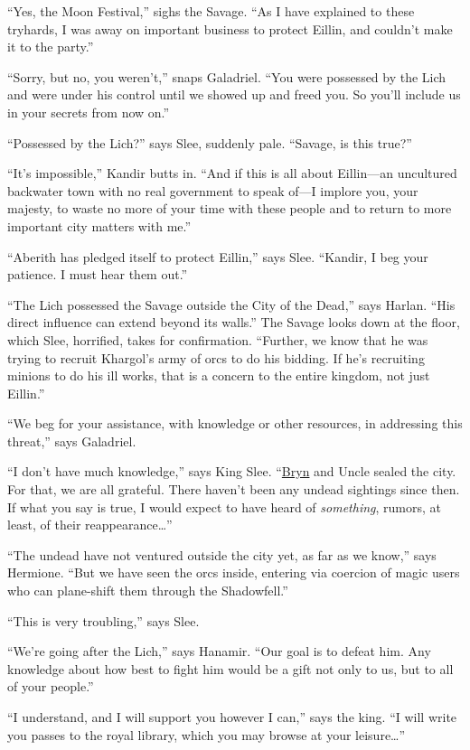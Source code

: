 \documentclass[smalldemyvopaper,11pt,twoside,onecolumn,openright,extrafontsizes]{memoir}
\begin{document}
``Yes, the Moon Festival,'' sighs the Savage. ``As I have explained to
these tryhards, I was away on important business to protect Eillin, and
couldn't make it to the party.''

``Sorry, but no, you weren't,'' snaps Galadriel. ``You were possessed by
the Lich and were under his control until we showed up and freed you. So
you'll include us in your secrets from now on.''

``Possessed by the Lich?'' says Slee, suddenly pale. ``Savage, is this
true?''

``It's impossible,'' Kandir butts in. ``And if this is all about
Eillin---an uncultured backwater town with no real government to speak
of---I implore you, your majesty, to waste no more of your time with
these people and to return to more important city matters with me.''

``Aberith has pledged itself to protect Eillin,'' says Slee. ``Kandir, I
beg your patience. I must hear them out.''

``The Lich possessed the Savage outside the City of the Dead,'' says
Harlan. ``His direct influence can extend beyond its walls.'' The Savage
looks down at the floor, which Slee, horrified, takes for confirmation.
``Further, we know that he was trying to recruit Khargol's army of orcs
to do his bidding. If he's recruiting minions to do his ill works, that
is a concern to the entire kingdom, not just Eillin.''

``We beg for your assistance, with knowledge or other resources, in
addressing this threat,'' says Galadriel.

``I don't have much knowledge,'' says King Slee.
``\href{/characters/bryn/}{Bryn} and Uncle sealed the city. For that, we
are all grateful. There haven't been any undead sightings since then. If
what you say is true, I would expect to have heard of \emph{something},
rumors, at least, of their reappearance\ldots{}''

``The undead have not ventured outside the city yet, as far as we
know,'' says Hermione. ``But we have seen the orcs inside, entering via
coercion of magic users who can plane-shift them through the
Shadowfell.''

``This is very troubling,'' says Slee.

``We're going after the Lich,'' says Hanamir. ``Our goal is to defeat
him. Any knowledge about how best to fight him would be a gift not only
to us, but to all of your people.''

``I understand, and I will support you however I can,'' says the king.
``I will write you passes to the royal library, which you may browse at
your leisure\ldots{}''
\end{document}
